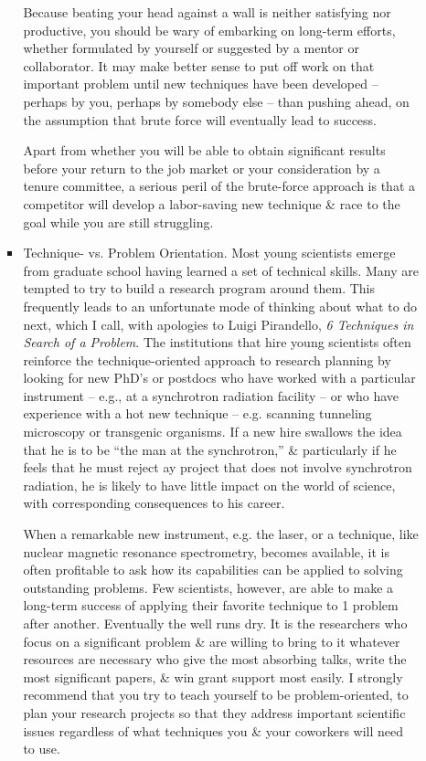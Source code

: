 \documentclass{article}
\begin{document}
\begin{enumerate}
\begin{itemize}
\begin{itemize}
			Because beating your head against a wall is neither satisfying nor productive, you should be wary of embarking on long-term efforts, whether formulated by yourself or suggested by a mentor or collaborator. It may make better sense to put off work on that important problem until new techniques have been developed -- perhaps by you, perhaps by somebody else -- than pushing ahead, on the assumption that brute force will eventually lead to success.
			
			Apart from whether you will be able to obtain significant results before your return to the job market or your consideration by a tenure committee, a serious peril of the brute-force approach is that a competitor will develop a labor-saving new technique \& race to the goal while you are still struggling.
			\item {\sf Technique- vs. Problem Orientation.} Most young scientists emerge from graduate school having learned a set of technical skills. Many are tempted to try to build a research program around them. This frequently leads to an unfortunate mode of thinking about what to do next, which I call, with apologies to {\sc Luigi Pirandello}, {\it6 Techniques in Search of a Problem}. The institutions that hire young scientists often reinforce the technique-oriented approach to research planning by looking for new PhD's or postdocs who have worked with a particular instrument -- e.g., at a synchrotron radiation facility -- or who have experience with a hot new technique -- e.g. scanning tunneling microscopy or transgenic organisms. If a new hire swallows the idea that he is to be ``the man at the synchrotron,'' \& particularly if he feels that he must reject ay project that does not involve synchrotron radiation, he is likely to have little impact on the world of science, with corresponding consequences to his career.
			
			When a remarkable new instrument, e.g. the laser, or a technique, like nuclear magnetic resonance spectrometry, becomes available, it is often profitable to ask how its capabilities can be applied to solving outstanding problems. Few scientists, however, are able to make a long-term success of applying their favorite technique to 1 problem after another. Eventually the well runs dry. It is the researchers who focus on a significant problem \& are willing to bring to it whatever resources are necessary who give the most absorbing talks, write the most significant papers, \& win grant support most easily. I strongly recommend that you try to teach yourself to be problem-oriented, to plan your research projects so that they address important scientific issues regardless of what techniques you \& your coworkers will need to use.
			

\end{itemize}
\end{itemize}
\end{enumerate}
\end{document}
